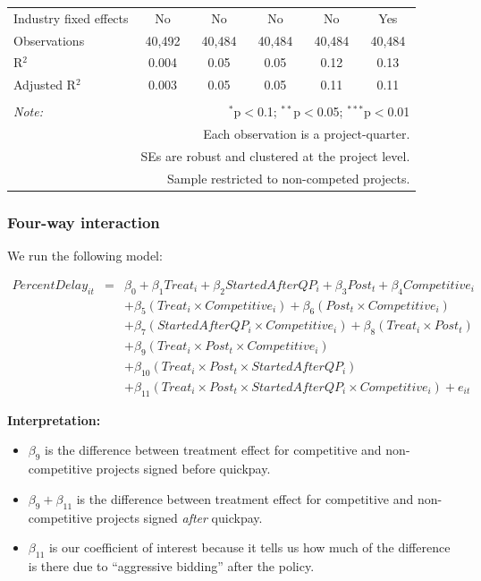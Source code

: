 \documentclass[
]{article}
\providecommand{\tightlist}{%
  \setlength{\itemsep}{0pt}\setlength{\parskip}{0pt}}
\begin{document}
\begin{table}[H]
\begin{tabular}{@{\extracolsep{-2pt}}lccccc}
Industry fixed effects & No & No & No & No & Yes \\ 
Observations & 40,492 & 40,484 & 40,484 & 40,484 & 40,484 \\ 
R$^{2}$ & 0.004 & 0.05 & 0.05 & 0.12 & 0.13 \\ 
Adjusted R$^{2}$ & 0.003 & 0.05 & 0.05 & 0.11 & 0.11 \\ 
\hline 
\hline \\[-1.8ex] 
\textit{Note:}  & \multicolumn{5}{r}{$^{*}$p$<$0.1; $^{**}$p$<$0.05; $^{***}$p$<$0.01} \\ 
 & \multicolumn{5}{r}{Each observation is a project-quarter.} \\ 
 & \multicolumn{5}{r}{SEs are robust and clustered at the project level.} \\ 
 & \multicolumn{5}{r}{Sample restricted to non-competed projects.} \\ 
\end{tabular} 
\end{table}

\hypertarget{four-way-interaction}{%
\subsubsection{Four-way interaction}\label{four-way-interaction}}

We run the following model:

\[\begin{aligned} PercentDelay_{it} &=& \beta_0 +\beta_1 Treat_i+ \beta_2 StartedAfterQP_i+ \beta_3 Post_t+ \beta_4 Competitive_i\\ && +  \beta_5 (Treat_i \times Competitive_i) + \beta_6 (Post_t \times Competitive_i)\\ && +  \beta_7 (StartedAfterQP_i \times Competitive_i) +\beta_8 (Treat_i \times Post_t)\\ && + \beta_9 (Treat_i \times Post_t \times Competitive_i) \\ && + \beta_{10} (Treat_i \times Post_t \times StartedAfterQP_i )\\ && + \beta_{11} (Treat_i \times Post_t \times StartedAfterQP_i \times Competitive_i) + e_{it} \end{aligned}\]

\textbf{Interpretation:}

\begin{itemize}
\tightlist
\item
  \(\beta_9\) is the difference between treatment effect for competitive
  and non-competitive projects signed before quickpay.
\item
  \(\beta_9 + \beta_{11}\) is the difference between treatment effect
  for competitive and non-competitive projects signed \emph{after}
  quickpay.
\item
  \(\beta_{11}\) is our coefficient of interest because it tells us how
  much of the difference is there due to ``aggressive bidding'' after
  the policy.
\end{itemize}
\end{document}
